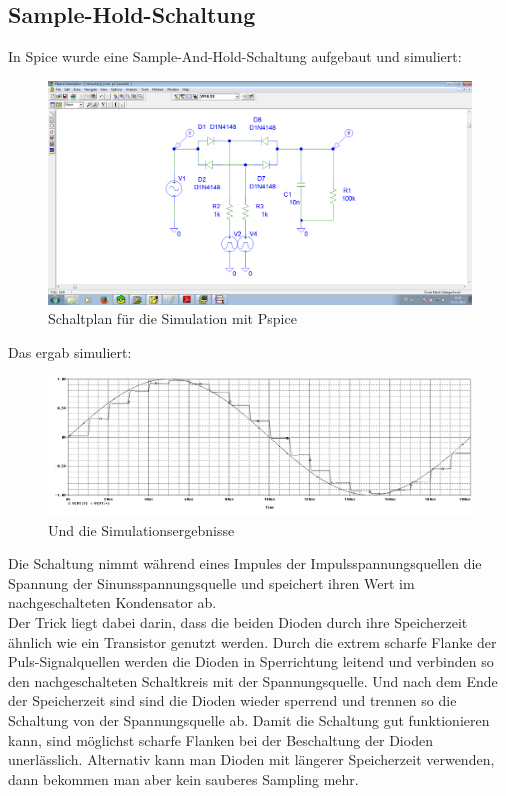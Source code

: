 \subsection{Sample-Hold-Schaltung}
In Spice wurde eine Sample-And-Hold-Schaltung aufgebaut und simuliert:
\begin{figure}[H]
	\centering
	\includegraphics[width=\linewidth]{versuch2/spice/v2_8_1_schematic.png}
	\caption{Schaltplan für die Simulation mit Pspice}
\end{figure}
Das ergab simuliert:
\begin{figure}[H]
	\centering
	\includegraphics[width=\linewidth]{versuch2/spice/v2_8_1_simulation.png}
	\caption{Und die Simulationsergebnisse}
\end{figure}
Die Schaltung nimmt während eines Impules der Impulsspannungsquellen die Spannung der Sinunsspannungsquelle und speichert ihren Wert im nachgeschalteten Kondensator ab.\\
Der Trick liegt dabei darin, dass die beiden Dioden durch ihre Speicherzeit ähnlich wie ein Transistor genutzt werden. Durch die extrem scharfe Flanke der Puls-Signalquellen werden die Dioden in Sperrichtung leitend und verbinden so den nachgeschalteten Schaltkreis mit der Spannungsquelle. Und nach dem Ende der Speicherzeit sind sind die Dioden wieder sperrend und trennen so die Schaltung von der Spannungsquelle ab. Damit die Schaltung gut funktionieren kann, sind möglichst scharfe Flanken bei der Beschaltung der Dioden unerlässlich. Alternativ kann man Dioden mit längerer Speicherzeit verwenden, dann bekommen man aber kein sauberes Sampling mehr.

